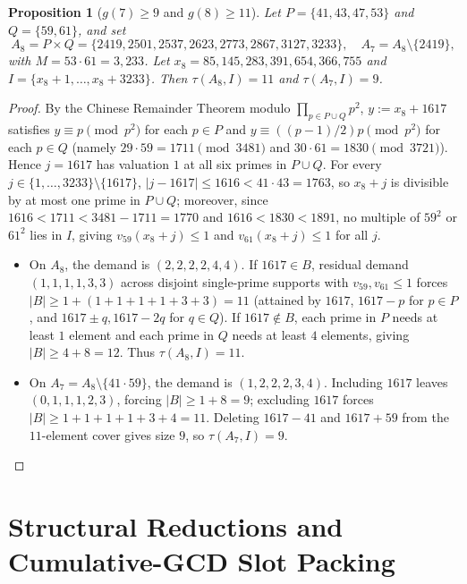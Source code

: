 \documentclass[11pt]{article}
\newtheorem{proposition}[theorem]{Proposition}
\begin{document}
\begin{proposition}[$g(7) \ge 9$ and $g(8) \ge 11$]
\label{prop:g78}
Let $P = \{41, 43, 47, 53\}$ and $Q = \{59, 61\}$, and set
\[
A_8 = P \times Q = \{2419, 2501, 2537, 2623, 2773, 2867, 3127, 3233\}, \quad A_7 = A_8 \setminus \{2419\},
\]
with $M = 53 \cdot 61 = 3{,}233$. Let $x_8 = 85{,}145{,}283{,}391{,}654{,}366{,}755$ and $I = \{x_8 + 1, \dots, x_8 + 3233\}$. Then $\tau(A_8, I) = 11$ and $\tau(A_7, I) = 9$.
\end{proposition}
\begin{proof}
By the Chinese Remainder Theorem modulo $\prod_{p \in P \cup Q} p^2$, $y := x_8 + 1617$ satisfies $y \equiv p \pmod{p^2}$ for each $p \in P$ and $y \equiv ((p - 1) / 2) p \pmod{p^2}$ for each $p \in Q$ (namely $29 \cdot 59 = 1711 \pmod{3481}$ and $30 \cdot 61 = 1830 \pmod{3721}$). Hence $j = 1617$ has valuation $1$ at all six primes in $P \cup Q$. For every $j \in \{1, \dots, 3233\} \setminus \{1617\}$, $|j - 1617| \le 1616 < 41 \cdot 43 = 1763$, so $x_8 + j$ is divisible by at most one prime in $P \cup Q$; moreover, since $1616 < 1711 < 3481 - 1711 = 1770$ and $1616 < 1830 < 1891$, no multiple of $59^2$ or $61^2$ lies in $I$, giving $v_{59}(x_8 + j) \le 1$ and $v_{61}(x_8 + j) \le 1$ for all $j$.
\begin{itemize}
\item On $A_8$, the demand is $(2, 2, 2, 2, 4, 4)$. If $1617 \in B$, residual demand $(1, 1, 1, 1, 3, 3)$ across disjoint single-prime supports with $v_{59}, v_{61} \le 1$ forces $|B| \ge 1 + (1 + 1 + 1 + 1 + 3 + 3) = 11$ (attained by $1617$, $1617 - p$ for $p \in P$, and $1617 \pm q, 1617 - 2q$ for $q \in Q$). If $1617 \notin B$, each prime in $P$ needs at least $1$ element and each prime in $Q$ needs at least $4$ elements, giving $|B| \ge 4 + 8 = 12$. Thus $\tau(A_8, I) = 11$.
\item On $A_7 = A_8 \setminus \{41 \cdot 59\}$, the demand is $(1, 2, 2, 2, 3, 4)$. Including $1617$ leaves $(0, 1, 1, 1, 2, 3)$, forcing $|B| \ge 1 + 8 = 9$; excluding $1617$ forces $|B| \ge 1 + 1 + 1 + 1 + 3 + 4 = 11$. Deleting $1617 - 41$ and $1617 + 59$ from the $11$-element cover gives size $9$, so $\tau(A_7, I) = 9$.
\end{itemize}
\end{proof}

\section{Structural Reductions and Cumulative-GCD Slot Packing}
\end{document}
